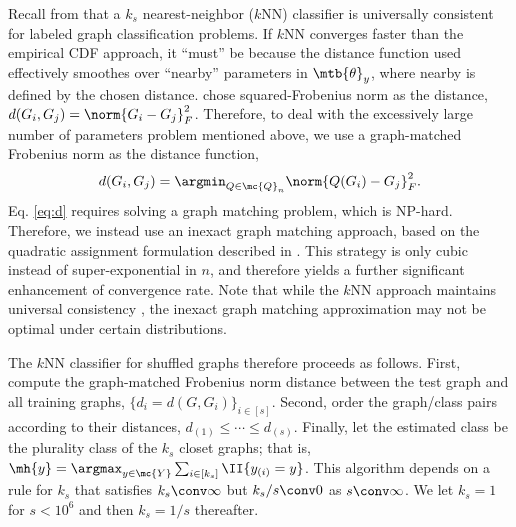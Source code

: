 \documentclass[10pt,journal,cspaper,compsoc]{IEEEtran}
\begin{document}
Recall from \cite{VP11super} that a $k_s$ nearest-neighbor ($k$NN) classifier is universally consistent for labeled graph classification problems.  If $k$NN converges faster than the empirical CDF approach, it ``must'' be because the distance function used effectively smoothes over ``nearby'' parameters in $\mtb{\theta}_y$, where nearby is defined by the chosen distance. \cite{VP11super} chose squared-Frobenius norm as the distance, $d(G_i,G_j)=\norm{G_i-G_j}_F^2$.  Therefore, to deal with the excessively large number of parameters problem mentioned above, we use a graph-matched Frobenius norm as the distance function, 
\begin{align} \label{eq:d}
d(G_i,G_j)=\argmin_{Q \in \mc{Q}_n}\norm{Q(G_i)-G_j}_F^2.	
\end{align}
Eq. \eqref{eq:d} requires solving a graph matching problem, which is NP-hard.  Therefore, we instead use an inexact graph matching approach, based on the quadratic assignment formulation described in \cite{VP11QAP}.  This strategy is only cubic instead of super-exponential in $n$, and therefore yields a further significant enhancement of convergence rate.  Note that while the $k$NN approach maintains universal consistency \cite{VP11super}, the inexact graph matching approximation may not be optimal under certain distributions.  

The $k$NN classifier for shuffled graphs therefore proceeds as follows.  First, compute the graph-matched Frobenius norm distance between the test graph and all training graphs, $\{d_i=d(G,G_i)\}_{i \in [s]}$.  Second, order the graph/class pairs according to their distances, $d_{(1)} \leq \cdots \leq d_{(s)}$.  Finally, let the estimated class be the plurality class of the $k_s$ closet graphs; that is, $\mh{y}=\argmax_{y \in \mc{Y}} \sum_{i \in [k_s]} \II\{y_{(i)}=y\}$. This algorithm depends on a rule for $k_s$ that satisfies $k_s \conv \infty$ but $k_s/s \conv 0$ as $s \conv \infty$.  We let $k_s=1$ for $s<10^6$ and then $k_s=1/s$ thereafter.
\end{document}
